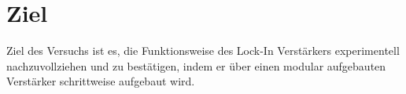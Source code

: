 \section{Ziel}
\label{sec:Ziel}

Ziel des Versuchs ist es, die Funktionsweise des Lock-In Verstärkers
experimentell nachzuvollziehen und zu bestätigen, indem er über einen
modular aufgebauten Verstärker schrittweise aufgebaut wird.

